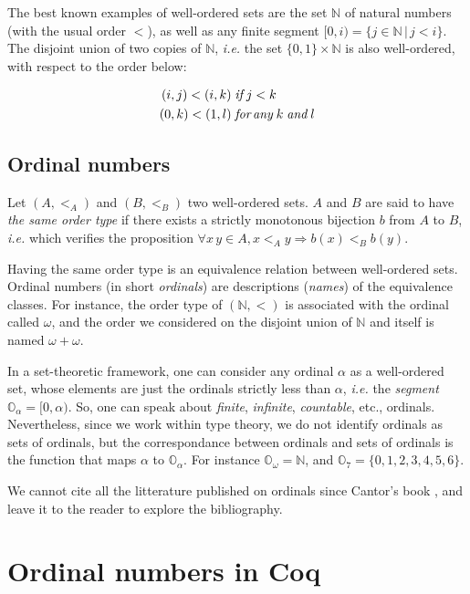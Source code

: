 \documentclass[a4paper]{book}
\begin{document}
The best known examples of well-ordered sets are the set $\mathbb{N}$ of natural numbers (with the usual order $<$), as well as any finite segment $[0,i)=\{j\in\mathbb{N}\,|\,j<i\}$.
The disjoint union of two copies of $\mathbb{N}$, \emph{i.e.} the set $\{0,1\}\times\mathbb{N}$ is also well-ordered,
with respect to the order below:

\begin{align*}
(i,j) < (i,k) & \;\textit{if} \; j < k\\
(0,k) < (1,l) & \;\textit{for\,any}\;k \;\textit{and} \; l
\end{align*}

\subsection{Ordinal numbers}


Let $(A,<_A)$ and $(B,<_B)$ two well-ordered sets. $A$ and $B$ are said to have \emph{the same order type} if 
there exists a strictly monotonous bijection $b$ from $A$ to $B$, \emph{i.e.} which verifies the proposition
$\forall x\,y\in A, x <_A y \Rightarrow b(x) <_B  b(y)$.

Having the same order type is an equivalence relation between well-ordered sets. Ordinal numbers (in short \emph{ordinals}) are descriptions (\emph{names}) of the equivalence classes.
For instance, the order type of $(\mathbb{N},<)$ is associated with the ordinal called  $\omega$, and the order we considered on 
the disjoint union of $\mathbb{N}$ and itself is named $\omega+\omega$.

In a set-theoretic framework, one can consider any ordinal $\alpha$ as a well-ordered set, whose  elements are just the ordinals strictly less than $\alpha$, \emph{i.e.} the \emph{segment} $\mathbb{O}_\alpha=[0, \alpha)$. So, one can speak about \emph{finite}, \emph{infinite}, \emph{countable}, etc., ordinals. Nevertheless, since we work within type theory, 
we do not identify ordinals as sets of ordinals, but the correspondance between ordinals and sets of ordinals is the function that maps $\alpha$ to $\mathbb{O}_\alpha$.
For instance $\mathbb{O}_\omega=\mathbb{N}$, and $\mathbb{O}_7=\{0,1,2,3,4,5,6\}$.


We cannot cite all the litterature published on ordinals since Cantor's book 
\cite{cantorbook}, and 
leave it to the reader to explore the bibliography. 


\section{Ordinal numbers in Coq}
\end{document}
